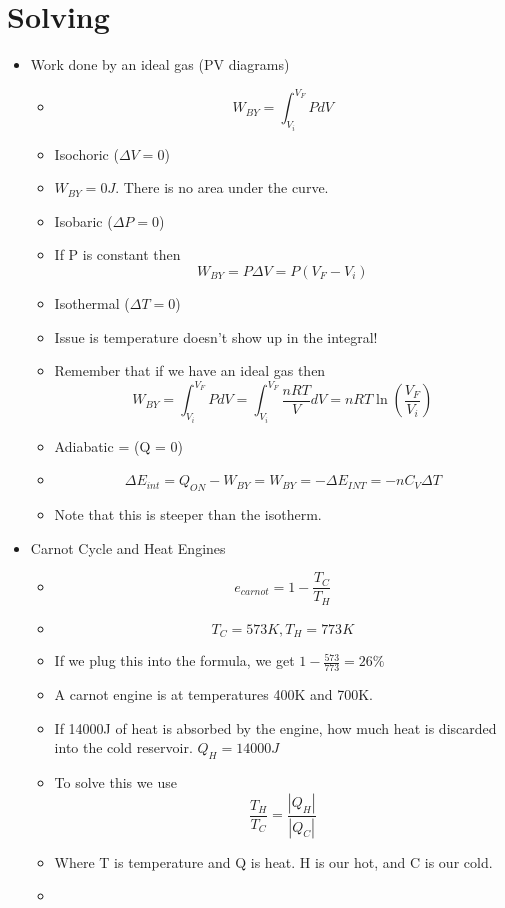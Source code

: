 \documentclass{article}
\begin{document}
\section{Solving}
\begin{itemize}
    \item Work done by an ideal gas (PV diagrams)
    \begin{itemize}
        \item $$W_{BY}=\int_{V_i}^{V_F}PdV$$
        \item Isochoric ($\Delta V = 0$)
        \item $W_{BY}=0J$. There is no area under the curve.
        \item Isobaric ($\Delta P = 0$)
        \item If P is constant then $$W_{BY}=P\Delta V=P(V_F-V_i)$$
        \item Isothermal ($\Delta T = 0$)
        \item Issue is temperature doesn't show up in the integral!
        \item Remember that if we have an ideal gas then $$W_{BY}=\int_{V_i}^{V_F}PdV=\int_{V_i}^{V_F}\frac{nRT}{V}dV=nRT\ln(\frac{V_F}{V_i})$$
        \item Adiabatic = (Q = 0)
        \item $$\Delta E_{int}=Q_{ON}-W_{BY}=W_{BY}=-\Delta E_{INT}=-nC_V\Delta T$$
        \item Note that this is steeper than the isotherm.
    \end{itemize}
    \item Carnot Cycle and Heat Engines
    \begin{itemize}
        \item $$e_{carnot} = 1 - \frac{T_C}{T_H}$$
        \item $$T_C=573K, T_H=773K$$
        \item If we plug this into the formula, we get $1-\frac{573}{773} = 26\%$
        \item A carnot engine is at temperatures 400K and 700K.
        \item If 14000J of heat is absorbed by the engine, how much heat is discarded into the cold reservoir. $Q_H=14000J$
        \item To solve this we use $$\frac{T_H}{T_C}=\frac{|Q_H|}{|Q_C|}$$
        \item Where T is temperature and Q is heat. H is our hot, and C is our cold.
        \item 
    \end{itemize}
\end{itemize}
\end{document}
